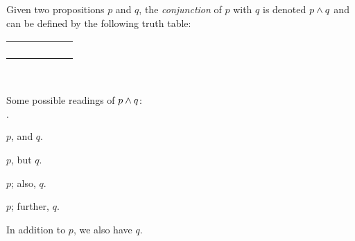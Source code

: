 \begin{definition}[Conjunction]
    \begin{minipage}[t]{.55\linewidth}
        Given two propositions $p$ and $q$, the \emph{conjunction} of $p$ with $q$
        is denoted $p \wedge q$ and can be defined by the following truth table:
        \begin{table}[H]
            \centering
            \label{tab:and}
            \begin{tabular}{|CcCc||Cc|} \hline
                 &  &  \\ \hline
                \thead{$\top$} & \thead{$\top$} &  \\
                \thead{$\top$} & \thead{$\bot$} &  \\
                \thead{$\bot$} & \thead{$\top$} &  \\
                \thead{$\bot$} & \thead{$\bot$} &  \\ \hline
            \end{tabular}
        \end{table}
    \end{minipage}%
    \begin{minipage}[t]{.05\linewidth}
        ~
    \end{minipage}%
    \begin{minipage}[t]{.4\linewidth}
        Some possible readings of $p \wedge q$:\\
        \begin{list}{$\cdot$}{}
            \item
                $p$, and $q$.
            \item
                $p$, but $q$.
            \item
                $p$; also, $q$.
            \item
                $p$; further, $q$.
            \item
                In addition to $p$, we also have $q$.
        \end{list}
    \end{minipage}
\end{definition}

\newpage

